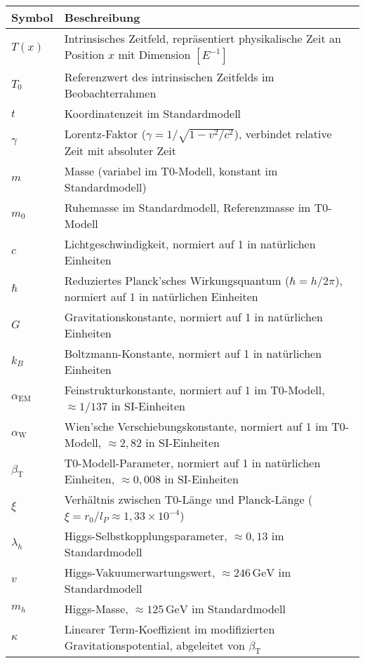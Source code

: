 \documentclass[12pt,a4paper]{article}
\newcommand{\Tfield}{T(x)}
\newcommand{\betaT}{\beta_{\text{T}}}
\newcommand{\alphaEM}{\alpha_{\text{EM}}}
\newcommand{\alphaW}{\alpha_{\text{W}}}
\newcommand{\Tzero}{T_0}
\begin{document}
	\begin{table}[h]
		\centering
		\begin{tabular}{>{\RaggedRight}p{} >{\RaggedRight}p{}}
			\toprule
			\textbf{Symbol} & \textbf{Beschreibung} \\
			\midrule
			$\Tfield$ & Intrinsisches Zeitfeld, repräsentiert physikalische Zeit an Position $x$ mit Dimension $[E^{-1}]$ \\
			$\Tzero$ & Referenzwert des intrinsischen Zeitfelds im Beobachterrahmen \\
			$t$ & Koordinatenzeit im Standardmodell \\
			$\gamma$ & Lorentz-Faktor ($\gamma = 1 / \sqrt{1 - v^2 / c^2}$), verbindet relative Zeit mit absoluter Zeit \\
			$m$ & Masse (variabel im T0-Modell, konstant im Standardmodell) \\
			$m_0$ & Ruhemasse im Standardmodell, Referenzmasse im T0-Modell \\
			$c$ & Lichtgeschwindigkeit, normiert auf 1 in natürlichen Einheiten \\
			$\hbar$ & Reduziertes Planck’sches Wirkungsquantum ($\hbar = h / 2\pi$), normiert auf 1 in natürlichen Einheiten \\
			$G$ & Gravitationskonstante, normiert auf 1 in natürlichen Einheiten \\
			$k_B$ & Boltzmann-Konstante, normiert auf 1 in natürlichen Einheiten \\
			$\alphaEM$ & Feinstrukturkonstante, normiert auf 1 im T0-Modell, $\approx 1/137$ in SI-Einheiten \\
			$\alphaW$ & Wien’sche Verschiebungskonstante, normiert auf 1 im T0-Modell, $\approx 2,82$ in SI-Einheiten \\
			$\betaT$ & T0-Modell-Parameter, normiert auf 1 in natürlichen Einheiten, $\approx 0,008$ in SI-Einheiten \\
			$\xi$ & Verhältnis zwischen T0-Länge und Planck-Länge ($\xi = r_0 / l_P \approx 1,33 \times 10^{-4}$) \\
			$\lambda_h$ & Higgs-Selbstkopplungsparameter, $\approx 0,13$ im Standardmodell \\
			$v$ & Higgs-Vakuumerwartungswert, $\approx 246 \, \text{GeV}$ im Standardmodell \\
			$m_h$ & Higgs-Masse, $\approx 125 \, \text{GeV}$ im Standardmodell \\
			$\kappa$ & Linearer Term-Koeffizient im modifizierten Gravitationspotential, abgeleitet von $\betaT$ \\

\end{tabular}
\end{table}
\end{document}
